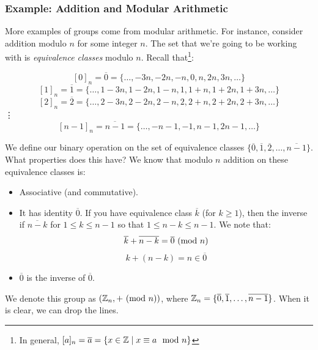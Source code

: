 \documentclass[letterpaper]{article}
\begin{document}
\subsubsection{Example: Addition and Modular Arithmetic}
More examples of groups come from modular arithmetic. For instance, consider addition modulo $n$ for some integer $n$. The set that we're going to be working with is \emph{equivalence classes} modulo $n$. Recall that\footnote{In general, $[a]_n = \overline{a} = \{x \in \mathbb{Z} \mid x \equiv a \mod{n}\}$}:
\begin{center}
    \[[0]_n = \overline{0} = \{\dots, -3n, -2n, -n, 0, n, 2n, 3n, \dots\}\]
    \[[1]_n = \overline{1} = \{\dots, 1 - 3n, 1 - 2n, 1 - n, 1, 1 + n, 1 + 2n, 1 + 3n, \dots\}\]
    \[[2]_n = \overline{2} = \{\dots, 2 - 3n, 2 - 2n, 2 - n, 2, 2 + n, 2 + 2n, 2 + 3n, \dots\}\]
    \vdots 
    \[[n - 1]_n = \overline{n - 1} = \{\dots, -n - 1, -1, n - 1, 2n - 1, \dots\}\]
\end{center}
We define our binary operation on the set of equivalence classes $\{\overline{0}, \overline{1}, \overline{2}, \dots, \overline{n - 1}\}$. What properties does this have? We know that modulo $n$ addition on these equivalence classes is:
\begin{itemize}
    \item Associative (and commutative).
    \item It has identity $\overline{0}$. If you have equivalence class $\overline{k}$ (for $k \geq 1$), then the inverse if $\overline{n - k}$ for $1 \leq k \leq n - 1$ so that $1 \leq n - k \leq n - 1$. We note that:
    \[\overline{k} + \overline{n - k} = \overline{0} \ (\mathrm{mod}\ n)\]
    \[k + (n - k) = n \in \overline{0}\]
    \item $\overline{0}$ is the inverse of $\overline{0}$. 
\end{itemize}
We denote this group as $(\mathbb{Z}_n, + \ (\mathrm{mod}\ n))$, where $\mathbb{Z}_n = \{\overline{0}, \overline{1}, \dots, \overline{n - 1}\}$. When it is clear, we can drop the lines. 
\end{document}
